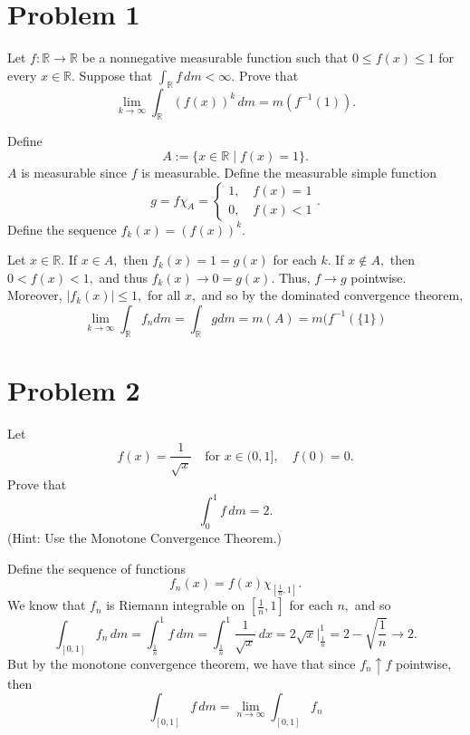 \documentclass[11pt]{article}
\newcommand{\bbR}{\mathbb{R}}
\begin{document}
	
	
	\psetheader

\section*{Problem 1}
Let \( f: \mathbb{R} \to \mathbb{R} \) be a nonnegative measurable function such that \( 0 \leq f(x) \leq 1 \) for every \( x \in \mathbb{R} \). Suppose that 
$
\int_{\mathbb{R}} f \, dm < \infty.$
Prove that 
\[
\lim_{k \to \infty} \int_{\mathbb{R}} (f(x))^k \, dm = m(f^{-1}(1)).
\]
\begin{solution}
    Define 
    \[A:= \{x \in \bbR \mid f(x) = 1\}.\] $A$ is measurable since $f$ is measurable. Define the measurable simple function
    \[g = f\chi_A = \begin{cases}
        1, \quad f(x) = 1\\
        0, \quad f(x) <1
    \end{cases}.\] 
    Define the sequence $f_k(x) = (f(x))^k.$
    
    Let $x\in \bbR.$ If $x\in A,$ then $f_k(x) = 1 = g(x)$ for each $k.$ If $x\notin A,$ then $0<f(x)<1,$ and thus $f_k(x) \to 0 = g(x).$ Thus, $f \to g$ pointwise. Moreover, $|f_k(x)| \leq 1,$ for all $x,$ and so by the dominated convergence theorem, 
    \[\lim_{k\to \infty}\int_\bbR f_n dm = \int_\bbR g dm = m(A) = m(f^{-1}(\{1\})\]
\end{solution}


\newpage
\section*{Problem 2}
Let 
\[
f(x) = \frac{1}{\sqrt{x}} \quad \text{for } x \in (0,1], \quad f(0) = 0.
\]
Prove that 
\[
\int_{0}^{1} f \, dm = 2.
\]
(Hint: Use the Monotone Convergence Theorem.)
\begin{solution}
    Define the sequence of functions
    \[f_n(x) = f(x)\chi_{[\frac{1}{n}, 1]}.\] We know that $f_n$ is Riemann integrable on $[\frac{1}{n}, 1]$ for each $n,$ and so 
    \[\int_{[0,1]} f_n \, dm = \int_\frac{1}{n}^1 f \, dm = \int_\frac{1}{n}^1 \frac{1}{\sqrt{x}}\,dx =  2\sqrt{x}\bigg|_\frac{1}{n}^1 = 2  - \sqrt{\frac{1}{n}} \to 2.\] But by the monotone convergence theorem, we have that since $f_n \uparrow f$ pointwise, then 
    \[\int_{[0,1]} f \, dm = \lim_{n\to \infty}\int_{[0,1]} {f_n}\]
\end{solution}


\newpage
\end{document}
